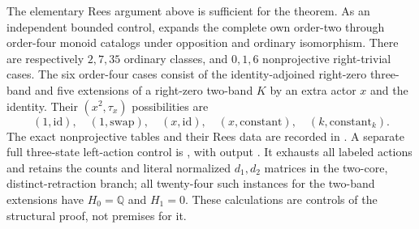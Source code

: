 \begin{remark}
\label{C:small-opposite-corner-inventory}
The elementary Rees argument above is sufficient for the theorem.
As an independent bounded control,
 expands the complete
own order-two through order-four monoid catalogs under opposition
and ordinary isomorphism. There are respectively $2,7,35$
ordinary classes, and $0,1,6$ nonprojective right-trivial cases.
The six order-four cases consist of the identity-adjoined
right-zero three-band and five extensions of a right-zero
two-band $K$ by an extra actor $x$ and the identity.
Their $(x^2,\tau_x)$ possibilities are
\[
 (1,\mathrm{id}),\quad(1,\mathrm{swap}),\quad
 (x,\mathrm{id}),\quad(x,\mathrm{constant}),\quad
 (k,\mathrm{constant}_k).
\]
The exact nonprojective tables and their Rees data are recorded in
.
A separate full three-state left-action control is
, with output
.
It exhausts all labeled actions and retains the counts and literal normalized
$d_1,d_2$ matrices in the two-core, distinct-retraction branch;
all twenty-four such instances for the two-band extensions
have $H_0=\mathbb Q$ and $H_1=0$. These calculations are
controls of the structural proof, not premises for it.
\end{remark}
